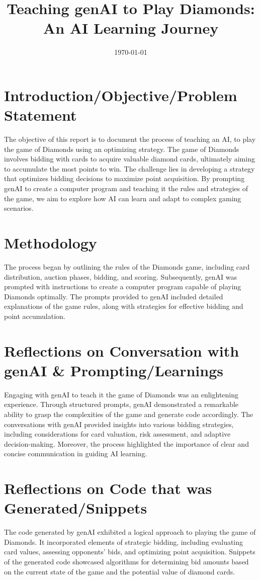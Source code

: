 \documentclass{article}
\title{Teaching genAI to Play Diamonds: An AI Learning Journey}
\date{\today}
\begin{document}
\maketitle

\section*{Introduction/Objective/Problem Statement}
The objective of this report is to document the process of teaching an AI, to play the game of Diamonds using an optimizing strategy. The game of Diamonds involves bidding with cards to acquire valuable diamond cards, ultimately aiming to accumulate the most points to win. The challenge lies in developing a strategy that optimizes bidding decisions to maximize point acquisition. By prompting genAI to create a computer program and teaching it the rules and strategies of the game, we aim to explore how AI can learn and adapt to complex gaming scenarios.

\section*{Methodology}
The process began by outlining the rules of the Diamonds game, including card distribution, auction phases, bidding, and scoring. Subsequently, genAI was prompted with instructions to create a computer program capable of playing Diamonds optimally. The prompts provided to genAI included detailed explanations of the game rules, along with strategies for effective bidding and point accumulation.

\section*{Reflections on Conversation with genAI \& Prompting/Learnings}
Engaging with genAI to teach it the game of Diamonds was an enlightening experience. Through structured prompts, genAI demonstrated a remarkable ability to grasp the complexities of the game and generate code accordingly. The conversations with genAI provided insights into various bidding strategies, including considerations for card valuation, risk assessment, and adaptive decision-making. Moreover, the process highlighted the importance of clear and concise communication in guiding AI learning.

\section*{Reflections on Code that was Generated/Snippets}
The code generated by genAI exhibited a logical approach to playing the game of Diamonds. It incorporated elements of strategic bidding, including evaluating card values, assessing opponents' bids, and optimizing point acquisition. Snippets of the generated code showcased algorithms for determining bid amounts based on the current state of the game and the potential value of diamond cards.
\end{document}
